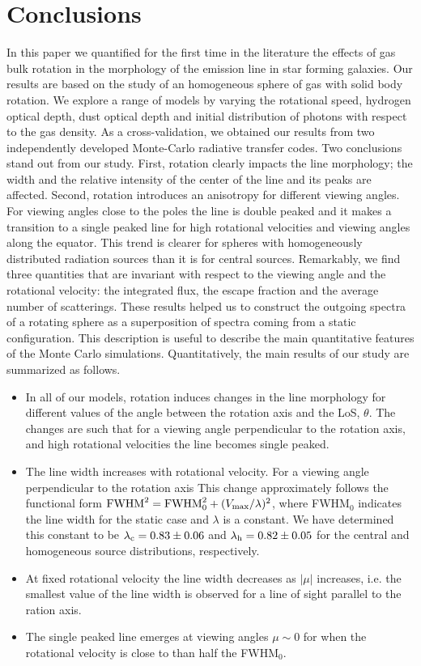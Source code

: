 \section{Conclusions}
\label{sec:conclusions}
In this paper we quantified for the first time in the literature the effects
of gas bulk rotation in the morphology of the \ly emission line in
star forming galaxies.
Our results are based on the study of an homogeneous sphere
of gas with solid body rotation.
We explore a range of models by varying the rotational speed, hydrogen
optical depth, dust optical depth and initial distribution of \ly
photons with respect to the gas density.
As a cross-validation, we obtained our results from two independently
developed Monte-Carlo radiative transfer codes.
Two conclusions stand out from our study.
First, rotation clearly impacts the \ly line morphology; the width and
the relative intensity of the center of the line and its peaks are
affected.
Second, rotation introduces an anisotropy for different viewing
angles.
For viewing angles close to the poles the line is double peaked and it
makes a transition to a single peaked line for high rotational
velocities and viewing angles along the equator.
This trend is clearer for spheres with homogeneously distributed
radiation sources than it is for central sources.
Remarkably, we find three quantities that are invariant with respect
to the viewing angle and the rotational velocity: the integrated flux,
the escape fraction and the average number of scatterings.
These results helped us to construct the outgoing spectra of a
rotating sphere as a superposition of spectra coming from a static
configuration. This description is useful to describe the main
quantitative features of the Monte Carlo simulations.
Quantitatively, the main results of our study are summarized as
follows.
\begin{itemize}
\item In all of our models, rotation induces changes in the line morphology
for different values of the angle between the rotation
axis and the LoS, $\theta$. The changes are such that for
a viewing angle perpendicular to the
rotation axis, and high rotational velocities the line becomes single peaked.
\item The line width increases with rotational
velocity. For a viewing angle perpendicular to the rotation axis
This change approximately follows the functional form ${\rm FWHM}^2
= {\rm FWHM}_{ 0}^2 + (V_{\rm max}/\lambda)^2$, where FWHM$_{0}$
indicates the line
width for the static case and $\lambda$ is a constant. We have
determined this constant to be $\lambda_{\rm c}=0.83 \pm 0.06$ and
$\lambda_{\rm h}=0.82\pm 0.05$ for the central and homogeneous source
distributions, respectively.
\item At fixed rotational velocity the line width decreases as $|\mu|$
increases, i.e. the smallest value of the line width is observed for
a line of sight parallel to the ration axis.
\item The single peaked line emerges at viewing angles $\mu\sim 0$ for
when the rotational velocity is close to than half the FWHM$_0$.
\end{itemize}
